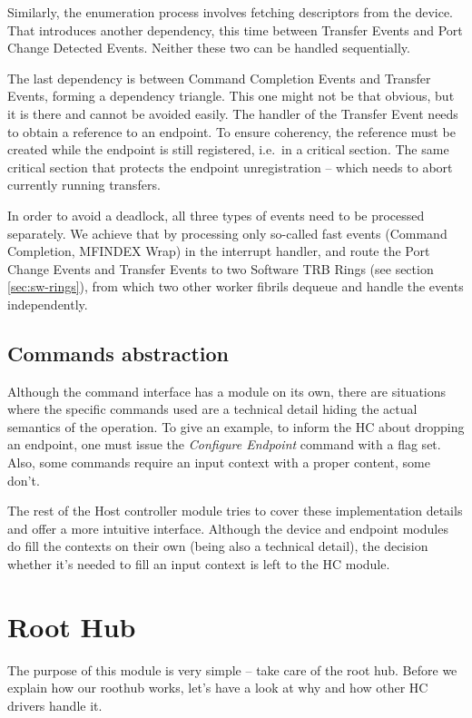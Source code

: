 Similarly, the enumeration process involves fetching descriptors from the
device. That introduces another dependency, this time between Transfer
Events and Port Change Detected Events. Neither these two can be handled
sequentially.

The last dependency is between Command Completion Events and Transfer Events,
forming a dependency triangle. This one might not be that obvious, but it is
there and cannot be avoided easily. The handler of the Transfer Event needs to
obtain a reference to an endpoint. To ensure coherency, the reference must be
created while the endpoint is still registered, i.e.\ in a critical section. The same
critical section that protects the endpoint unregistration -- which needs to
abort currently running transfers.

In order to avoid a deadlock, all three types of events need to be processed
separately. We achieve that by processing only so-called fast events (Command
Completion, MFINDEX Wrap) in the interrupt handler, and route the Port Change
Events and Transfer Events to two Software TRB Rings (see section \ref{sec:sw-rings}),
from which two other worker fibrils dequeue and handle the events independently.

\subsection{Commands abstraction}

Although the command interface has a module on its own, there are situations
where the specific commands used are a technical detail hiding the actual
semantics of the operation. To give an example, to inform the HC about dropping
an endpoint, one must issue the \emph{Configure Endpoint} command with a flag
set. Also, some commands require an input context with a proper content, some don't.

The rest of the Host controller module tries to cover these implementation
details and offer a more intuitive interface. Although the device and endpoint
modules do fill the contexts on their own (being also a technical detail), the
decision whether it's needed to fill an input context is left to the HC module.

\section{Root Hub}

The purpose of this module is very simple -- take care of the root hub. Before
we explain how our roothub works, let's have a look at why and how other HC
drivers handle it.

